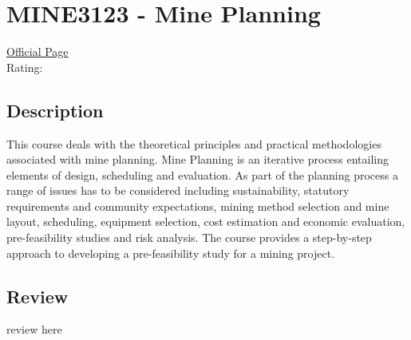 \hypertarget{MINE3123}{\section{MINE3123 - Mine Planning}}

\large
\textcolor{turbo_purple}{\href{https://my.uq.edu.au/programs-courses/course.html?course_code=MINE3123}{Official Page}} \\
Rating: \cstar\cstar\cstar\cstar\ostar

\normalsize
\subsection*{Description}
This course deals with the theoretical principles and practical methodologies associated with mine planning.
Mine Planning is an iterative process entailing elements of design, scheduling and evaluation. As part of the planning process a range of issues has to be considered including sustainability, statutory requirements and community expectations, mining method selection and mine layout, scheduling, equipment selection, cost estimation and economic evaluation, pre-feasibility studies and risk analysis.
The course provides a step-by-step approach to developing a pre-feasibility study for a mining project.

\subsection*{Review}
review here

